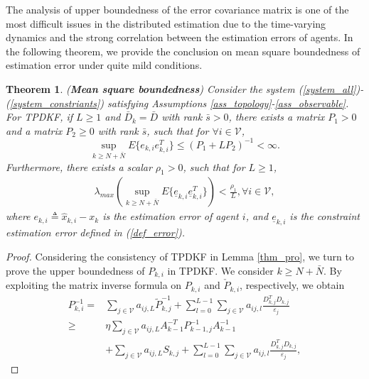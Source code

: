 \documentclass[journal,transmag]{IEEEtran}
\newtheorem{theorem}{\textbf{Theorem}}
\begin{document}
{	The analysis  of upper boundedness of the error covariance matrix is one of the most difficult issues in the distributed estimation due to the time-varying dynamics and the strong correlation between the estimation errors of agents. In the following theorem, we provide the conclusion on mean square boundedness of estimation error under quite mild conditions.		
	\begin{theorem}\label{thm_consistent}
		(\textbf{Mean square boundedness}) 
		Consider the system (\ref{system_all})-(\ref{system_constriants}) satisfying Assumptions  \ref{ass_topology}-\ref{ass_observable}. For TPDKF, if  $L\geq 1$ and $\bar D_{k}=\bar D$ with rank $\bar s>0$, there exists a  matrix $ P_1>0$ and a matrix $P_2\geq 0$ with rank $\bar s$, such that for $\forall i\in \mathcal{V}$,
		\begin{equation}\label{thm_compare}
		\sup_{k\geq N+\bar N} E\{e_{k,i}e_{k,i}^T\}\leq  \left(P_1+LP_2\right)^{-1}<\infty.   
		\end{equation}
Furthermore,   there exists a scalar $\rho_1>0$, such that for $L\geq 1$, 
\begin{align}
	\lambda_{max}\left(\sup_{k\geq N+\bar N} E\{\underline e_{k,i}\underline e_{k,i}^T\}\right)< \frac{\rho_1}{L}, \forall i\in\mathcal{V},
\end{align}
where $e_{k,i}\triangleq\hat x_{k,i}-x_{k}$ is the estimation error of agent $i$, and  $\underline e_{k,i}$ is the constraint estimation error defined in (\ref{def_error}).
	\end{theorem}
	\begin{proof}
 Considering the consistency of TPDKF in Lemma \ref{thm_pro}, we turn to prove  the  upper boundedness of $P_{k,i}$ in TPDKF.	
		We consider $k\geq N+\bar N$. 
		By exploiting the matrix inverse formula on $P_{ k,i}$ and $\check P_{ k,i}$, respectively, we obtain
		\begin{align}\label{proof_stability13}
		P_{ k,i}^{-1}	=&\sum_{j\in \mathcal{V}}a_{ij,L}\tilde P_{k,j}^{-1}+\sum_{l=0}^{L-1}\sum_{j\in \mathcal{V}}a_{ij,l}\frac{D_{k,j}^TD_{k,j}}{\varepsilon_j}\\
		\geq&  \eta\sum_{j\in  \mathcal{V}}a_{ij,L}A_{ k-1}^{-T}P_{ k-1,j}^{-1} A_{ k-1}^{-1}\nonumber\\
		&+\sum_{j\in  \mathcal{V}} a_{ij,L}S_{ k,j}+\sum_{l=0}^{L-1}\sum_{j\in \mathcal{V}}a_{ij,l}\frac{D_{k,j}^TD_{k,j}}{\varepsilon_j},\nonumber

\end{align}
\end{proof}}
\end{document}
